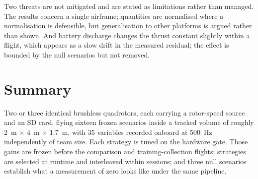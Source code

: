 Two threats are not mitigated and are stated as limitations rather than managed. The results
concern a single airframe; quantities are normalised where a normalisation is defensible, but
generalisation to other platforms is argued rather than shown. And battery discharge changes the
thrust constant slightly within a flight, which appears as a slow drift in the measured residual;
the effect is bounded by the null scenarios but not removed.

\section{Summary}
\label{sec:setup-summary}

Two or three identical brushless quadrotors, each carrying a rotor-speed source and an SD card,
flying sixteen frozen scenarios inside a tracked volume of roughly \SI{2}{\metre} $\times$
\SI{4}{\metre} $\times$ \SI{1.7}{\metre}, with \num{35} variables recorded onboard at
\SI{500}{\hertz} independently of team size. Each strategy is tuned on the hardware gate. Those
gains are frozen before the comparison and training-collection flights; strategies are selected at
runtime and interleaved within sessions; and three null scenarios
establish what a measurement of zero looks like under the same pipeline.

